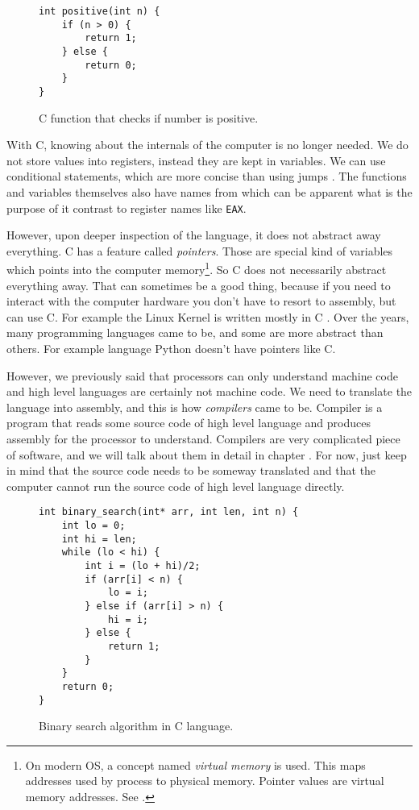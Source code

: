 \begin{figure}\label{fig:c-positive}
\begin{verbatim}
int positive(int n) {
    if (n > 0) {
        return 1;
    } else {
        return 0;
    }
}
\end{verbatim}
\caption{C function that checks if number is positive.}
\end{figure}

With C, knowing about the internals of the computer is no longer needed.
We do not store values into registers, instead they are kept in variables. We can use conditional statements,
which are more concise than using jumps \cite{gotobad}.
The functions and variables themselves also have names from which
can be apparent what is the purpose of it contrast to register names like \texttt{EAX}.

However, upon deeper inspection of the language, it does not abstract away everything. C has a feature called
\textit{pointers}. Those are special kind of variables which points into the computer memory\footnote{On modern OS,
a concept named \textit{virtual memory} is used. This maps addresses used by process to physical memory.
Pointer values are virtual memory addresses. See \cite{modern-os}.}.
So C does not necessarily abstract everything away. That can sometimes be a good thing, because if you need to
interact with the computer hardware you don't have to resort to assembly, but can use C. For example the Linux
Kernel is written mostly in C \cite{linux-source}. Over the years, many programming languages came to be, and
some are more abstract than others. For example language Python doesn't have pointers like C.

However, we previously said that processors can only understand machine code and high level languages are certainly not machine code.
We need to translate the language into assembly, and this is how \textit{compilers} came to be. Compiler is a program
that reads some source code of high level language and produces assembly for the processor to understand. Compilers
are very complicated piece of software, and we will talk about them in detail in chapter .
For now, just keep in mind that the source code needs to be someway translated and that the computer cannot
run the source code of high level language directly.

\begin{figure}[H]\label{fig:binary-search}
    \begin{verbatim}
int binary_search(int* arr, int len, int n) {
    int lo = 0;
    int hi = len;
    while (lo < hi) {
        int i = (lo + hi)/2;
        if (arr[i] < n) {
            lo = i;
        } else if (arr[i] > n) {
            hi = i;
        } else {
            return 1;
        }
    }
    return 0;
}
    \end{verbatim}
    \caption{Binary search algorithm in C language.}
\end{figure}

